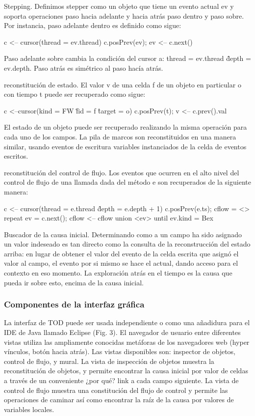 \documentclass[12pt,a4paper]{report}
\begin{document}
Stepping.  Definimos stepper como un objeto que tiene un evento actual ev y soporta operaciones paso hacia adelante y hacia atrás paso dentro y paso sobre.  Por instancia, paso adelante dentro es definido como sigue:

	c <-- cursor(thread = ev.thread)
	c.posPrev(ev); ev <-- c.next()

	Paso adelante sobre cambia la condición del cursor a: thread = ev.thread \^ depth = ev.depth.  Paso atrás es simétrico al paso hacía atrás.

reconstitución de estado.  El valor v de una celda f de un objeto en particular o con tiempo t puede ser recuperado como sigue:

	c <--cursor(kind = FW \^ fid = f \^ target = o)
	c.posPrev(t); v <-- c.prev().val

El estado de un objeto puede ser recuperado realizando la misma operación para cada uno de los campos.  La pila de marcos son reconstituidos en una manera similar, usando eventos de escritura variables instanciados de la celda de eventos escritos.

reconstitución del control de flujo.  Los eventos que ocurren en el alto nivel del control de flujo de una llamada dada del método e  son recuperados de la siguiente manera:

	c <-- cursor(thread = e.thread \^ depth = e.depth + 1)
	c.posPrev(e.ts); cflow = <>
	repeat
		ev = c.next(); cflow <-- cflow union <ev>
	until ev.kind = Bex

Buscador de la causa inicial.  Determinando como a un campo ha sido asignado un valor indeseado es tan directo como la consulta de la reconstrucción del estado arriba:  en lugar de obtener el valor del evento de la celda escrita que asignó el valor al campo, el evento por si mismo se hace el actual, dando acceso para el contexto en eso momento.  La exploración atrás en el tiempo es la causa que pueda ir sobre esto, encima de la causa inicial.

			\subsubsection{Componentes de la interfaz gráfica}

	La interfaz de TOD puede ser usada independiente o como una añadidura para el IDE de Java llamado Eclipse (Fig. 3).  El navegador de usuario entre diferentes vistas utiliza las ampliamente conocidas metáforas de los navegadores web (hyper vínculos, botón hacia atrás).  Las vistas disponibles son:  inspector de objetos, control de flujo, y mural.  La vista de inspección de objetos muestra la reconstitución de objetos, y permite encontrar la causa inicial por valor de celdas a través de un conveniente ¿por qué? link a cada campo siguiente. La vista de control de flujo muestra una constitución del flujo de control y permite las operaciones de caminar así como encontrar la raíz de la causa por valores de variables locales.
\end{document}
